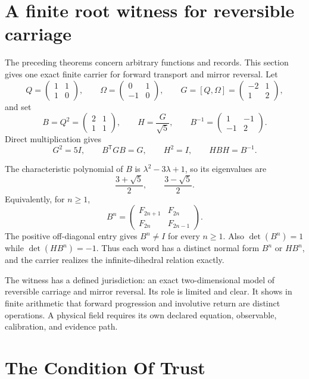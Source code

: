 \documentclass[11pt]{article}
\begin{document}
\section{A finite root witness for reversible carriage}

The preceding theorems concern arbitrary functions and records. This section gives one exact finite carrier for forward transport and mirror reversal. Let
\[
Q=\begin{pmatrix}1&1\\1&0\end{pmatrix},\qquad
\Omega=\begin{pmatrix}0&1\\-1&0\end{pmatrix},\qquad
G=[Q,\Omega]=\begin{pmatrix}-2&1\\1&2\end{pmatrix},
\tag{18}\label{eq:matrices}
\]
and set
\[
B=Q^2=\begin{pmatrix}2&1\\1&1\end{pmatrix},\qquad
H=\frac{G}{\sqrt5},\qquad
B^{-1}=\begin{pmatrix}1&-1\\-1&2\end{pmatrix}.
\tag{19}\label{eq:BH}
\]
Direct multiplication gives
\[
G^2=5I,\qquad B^{\mathsf T}GB=G,\qquad H^2=I,\qquad HBH=B^{-1}.
\tag{20}\label{eq:mirror}
\]

The characteristic polynomial of $B$ is $\lambda^2-3\lambda+1$, so its eigenvalues are
\[
\frac{3+\sqrt5}{2},\qquad\frac{3-\sqrt5}{2}.
\tag{21}\label{eq:eigs}
\]
Equivalently, for $n\ge1$,
\[
B^n=
\begin{pmatrix}
F_{2n+1}&F_{2n}\\
F_{2n}&F_{2n-1}
\end{pmatrix}.
\tag{22}\label{eq:fib}
\]
The positive off-diagonal entry gives $B^n\ne I$ for every $n\ge1$. Also $\det(B^n)=1$ while $\det(HB^n)=-1$. Thus each word has a distinct normal form $B^n$ or $HB^n$, and the carrier realizes the infinite-dihedral relation exactly.

The witness has a defined jurisdiction: an exact two-dimensional model of reversible carriage and mirror reversal. Its role is limited and clear. It shows in finite arithmetic that forward progression and involutive return are distinct operations. A physical field requires its own declared equation, observable, calibration, and evidence path.

\section{The Condition Of Trust}
\end{document}
